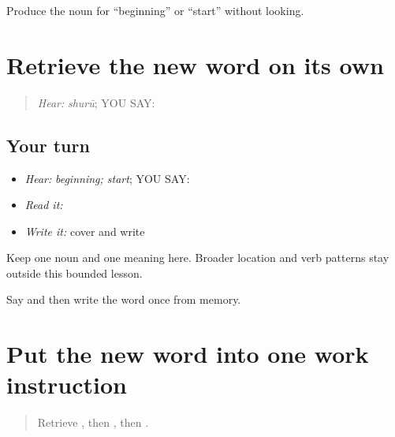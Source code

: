 \begin{tcolorbox}[breakable,colback=teal!4,colframe=teal!35!black,title={Before you move on}]
Produce the noun for “beginning” or “start” without looking.
\end{tcolorbox}
\section[\texorpdfstring{\pa{ਸ਼ੁਰੂ} (shuruu)}{ਸ਼ੁਰੂ (shuruu)}]{Retrieve the new word on its own}

\label{lesson:PA-C196-shuru-review}



\begin{quote}
\emph{Hear:} \emph{shurū}; YOU SAY: \textbf{}
\end{quote}

\subsection*{Your turn}
\begin{itemize}
\raggedright
  \item \emph{Hear:} \emph{beginning; start}; YOU SAY: \textbf{}
  \item \emph{Read it:} \textbf{}
  \item \emph{Write it:} cover and write \textbf{}
\end{itemize}

\begin{grammarlens}[title={Grammar Lens}]
Keep one noun and one meaning here. Broader location and verb patterns stay outside this bounded lesson.
\end{grammarlens}

\begin{tcolorbox}[breakable,colback=teal!4,colframe=teal!35!black,title={Before you move on}]
Say and then write the word once from memory.
\end{tcolorbox}
\section[\texorpdfstring{\pa{ਕੰਮ} \pa{ਸ਼ੁਰੂ} \pa{ਕਰੋ} (kamm shuruu karo)}{ਕੰਮ ਸ਼ੁਰੂ ਕਰੋ (kamm shuruu karo)}]{Put the new word into one work instruction}

\label{lesson:PA-C196-start-work-frame}



\begin{quote}
Retrieve \textbf{}, then \textbf{}, then \textbf{}.
\end{quote}

